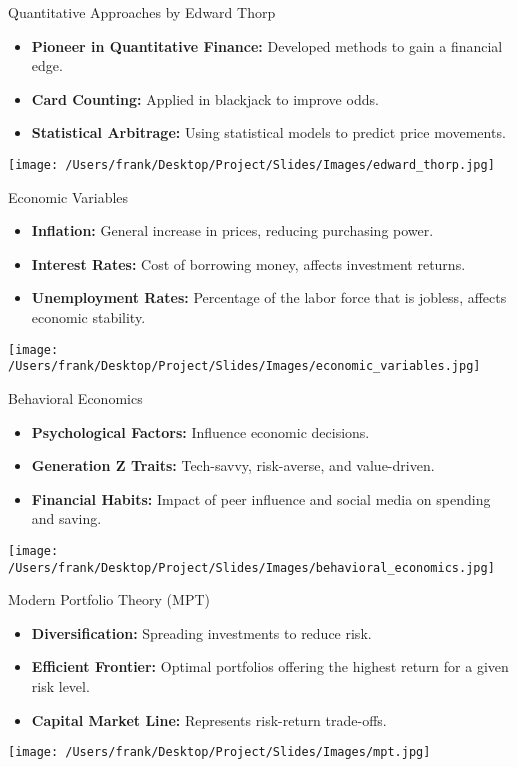 \documentclass{beamer}
\begin{document}
\begin{frame}{Quantitative Approaches by Edward Thorp}
    \begin{itemize}
        \item \textbf{Pioneer in Quantitative Finance:} Developed methods to gain a financial edge.
        \item \textbf{Card Counting:} Applied in blackjack to improve odds.
        \item \textbf{Statistical Arbitrage:} Using statistical models to predict price movements.
    \end{itemize}
    \centering
    \texttt{[image: /Users/frank/Desktop/Project/Slides/Images/edward\_thorp.jpg]}
\end{frame}

\begin{frame}{Economic Variables}
    \begin{itemize}
        \item \textbf{Inflation:} General increase in prices, reducing purchasing power.
        \item \textbf{Interest Rates:} Cost of borrowing money, affects investment returns.
        \item \textbf{Unemployment Rates:} Percentage of the labor force that is jobless, affects economic stability.
    \end{itemize}
    \centering
    \texttt{[image: /Users/frank/Desktop/Project/Slides/Images/economic\_variables.jpg]}
\end{frame}

\begin{frame}{Behavioral Economics}
    \begin{itemize}
        \item \textbf{Psychological Factors:} Influence economic decisions.
        \item \textbf{Generation Z Traits:} Tech-savvy, risk-averse, and value-driven.
        \item \textbf{Financial Habits:} Impact of peer influence and social media on spending and saving.
    \end{itemize}
    \centering
    \texttt{[image: /Users/frank/Desktop/Project/Slides/Images/behavioral\_economics.jpg]}
\end{frame}

\begin{frame}{Modern Portfolio Theory (MPT)}
    \begin{itemize}
        \item \textbf{Diversification:} Spreading investments to reduce risk.
        \item \textbf{Efficient Frontier:} Optimal portfolios offering the highest return for a given risk level.
        \item \textbf{Capital Market Line:} Represents risk-return trade-offs.
    \end{itemize}
    \centering
    \texttt{[image: /Users/frank/Desktop/Project/Slides/Images/mpt.jpg]}
\end{frame}
\end{document}

